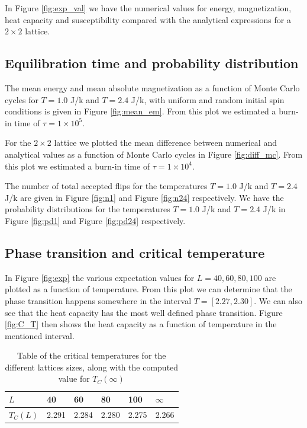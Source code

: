 \documentclass{article}
\begin{document}
\begin{multicols}{2}
In Figure \ref{fig:exp_val} we have the numerical values for energy, magnetization, heat capacity and susceptibility compared with the analytical expressions for a $2\times2$ lattice. 

\subsection{Equilibration time and probability distribution}

The mean energy and mean absolute magnetization as a function of Monte Carlo cycles for $T=1.0$ J/k and $T=2.4$ J/k, with uniform and random initial spin conditions is given in Figure \ref{fig:mean_em}. From this plot we estimated a burn-in time of $\tau = 1\times10^5$. 

For the $2\times2$ lattice we plotted the mean difference between numerical and analytical values as a function of Monte Carlo cycles in Figure \ref{fig:diff_mc}. From this plot we estimated a burn-in time of $\tau = 1\times10^4$. 

The number of total accepted flips for the temperatures $T=1.0$ J/k and $T=2.4$ J/k are given in Figure \ref{fig:n1} and Figure \ref{fig:n24} respectively. We have the probability distributions for the temperatures $T=1.0$ J/k and $T=2.4$ J/k in Figure \ref{fig:pd1} and Figure \ref{fig:pd24} respectively. 

\subsection{Phase transition and critical temperature}

In Figure \ref{fig:exp} the various expectation values for $L=40,60,80,100$ are plotted as a function of temperature. From this plot we can determine that the phase transition happens somewhere in the interval $T=[2.27, 2.30]$. We can also see that the heat capacity has the most well defined phase transition. Figure \ref{fig:C_T} then shows the heat capacity as a function of temperature in the mentioned interval. 

\begin{table}[H]
\caption{Table of the critical temperatures for the different lattices sizes, along with the computed value for $T_C(\infty)$}
\begin{tabular}{|l|l|l|l|l|l|}
\hline
$L$ & 40    & 60    & 80    & 100   & $\infty$   \\ \hline
$T_C(L)$ & 2.291 & 2.284 & 2.280 & 2.275 & 2.266 \\ \hline
\end{tabular}
\end{table}


\end{multicols}
\end{document}
